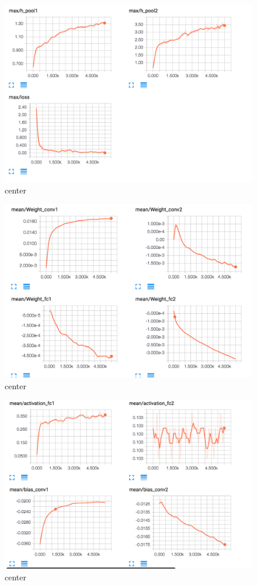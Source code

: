 \documentclass[12pt]{article}
\begin{document}
\begin{figure}[H]
  \caption{center}
  \centering
    \includegraphics[scale=0.3]{bmax4.png}
\end{figure}
\begin{figure}[H]
  \caption{center}
  \centering
    \includegraphics[scale=0.3]{bmean1.png}
\end{figure}
\begin{figure}[H]
  \caption{center}
  \centering
    \includegraphics[scale=0.3]{beam2.png}
\end{figure}
\end{document}
